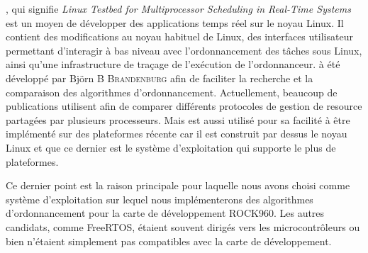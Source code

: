 \litmus, qui signifie \textit{Linux Testbed for Multiprocessor Scheduling in Real-Time Systems} est un moyen de développer des applications temps réel sur le noyau Linux. Il contient des modifications au noyau habituel de Linux, des interfaces utilisateur permettant d'interagir à bas niveau avec l'ordonnancement des tâches sous Linux, ainsi qu'une infrastructure de traçage de l'exécution de l'ordonnanceur.
\litmus à été développé par Björn \textsc{B Brandenburg} \cite{brandenburg2011scheduling} afin de faciliter la recherche et la comparaison des algorithmes d'ordonnancement. Actuellement, beaucoup de publications utilisent \litmus afin de comparer différents protocoles de gestion de resource partagées par plusieurs processeurs. Mais \litmus est aussi utilisé pour sa facilité à être implémenté sur des plateformes récente car il est construit par dessus le noyau Linux et que ce dernier est le système d'exploitation qui supporte le plus de plateformes. 

Ce dernier point est la raison principale pour laquelle nous avons choisi \litmus comme système d'exploitation sur lequel nous implémenterons des algorithmes d'ordonnancement pour la carte de développement ROCK960. Les autres candidats, comme FreeRTOS, étaient souvent dirigés vers les microcontrôleurs ou bien n'étaient simplement pas compatibles avec la carte de développement. 

